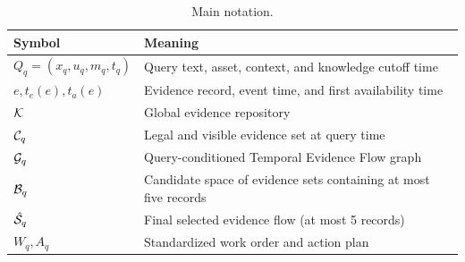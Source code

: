 \begin{table}[t]
\caption{Main notation.}
\label{tab:symbols}
\centering
\small
\begin{tabular}{@{}p{}p{}@{}}
\toprule
Symbol & Meaning \\
\midrule
$Q_q=(x_q,u_q,m_q,t_q)$ & Query text, asset, context, and knowledge cutoff time \\
$e,t_e(e),t_a(e)$ & Evidence record, event time, and first availability time \\
$\mathcal{K}$ & Global evidence repository \\
$\mathcal{C}_q$ & Legal and visible evidence set at query time \\
$\mathcal{G}_q$ & Query-conditioned Temporal Evidence Flow graph \\
$\mathcal{B}_q$ & Candidate space of evidence sets containing at most five records \\
$\hat{\mathcal{S}}_q$ & Final selected evidence flow (at most 5 records) \\
$W_q,A_q$ & Standardized work order and action plan \\
\bottomrule
\end{tabular}
\end{table}
